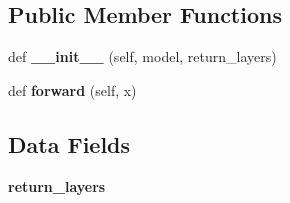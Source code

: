 \subsection*{Public Member Functions}
\begin{DoxyCompactItemize}
\item 
\mbox{\label{classtorchvision_1_1models_1_1__utils_1_1IntermediateLayerGetter_ac4031f4d205b805bd04df5ec19d2365f}} 
def {\bfseries \+\_\+\+\_\+init\+\_\+\+\_\+} (self, model, return\+\_\+layers)
\item 
\mbox{\label{classtorchvision_1_1models_1_1__utils_1_1IntermediateLayerGetter_af40e8ccf5f7daf76672236bd9f92dde9}} 
def {\bfseries forward} (self, x)
\end{DoxyCompactItemize}
\subsection*{Data Fields}
\begin{DoxyCompactItemize}
\item 
\mbox{\label{classtorchvision_1_1models_1_1__utils_1_1IntermediateLayerGetter_a16498de600d50509b4bdaa9d6c357a1f}} 
{\bfseries return\+\_\+layers}
\end{DoxyCompactItemize}


